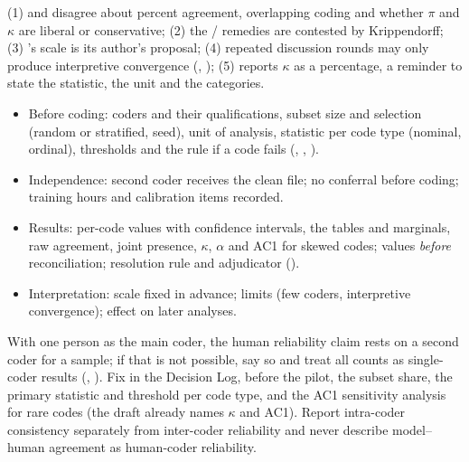 \begin{notebox}
(1)  and  disagree about percent agreement, overlapping coding and whether $\pi$ and $\kappa$ are liberal or conservative; (2) the / remedies are contested by Krippendorff; (3) 's scale is its author's proposal; (4) repeated discussion rounds may only produce interpretive convergence (, ); (5)  reports $\kappa$ as a percentage, a reminder to state the statistic, the unit and the categories.
\end{notebox}

\begin{protocolbox}
\begin{itemize}[leftmargin=1.3em]
\item Before coding: coders and their qualifications, subset size and selection (random or stratified, seed), unit of analysis, statistic per code type (nominal, ordinal), thresholds and the rule if a code fails (, , ).
\item Independence: second coder receives the clean file; no conferral before coding; training hours and calibration items recorded.
\item Results: per-code values with confidence intervals, the tables and marginals, raw agreement, joint presence, $\kappa$, $\alpha$ and AC1 for skewed codes; values \emph{before} reconciliation; resolution rule and adjudicator ().
\item Interpretation: scale fixed in advance; limits (few coders, interpretive convergence); effect on later analyses.
\end{itemize}
\end{protocolbox}

\begin{thesisbox}
With one person as the main coder, the human reliability claim rests on a second coder for a sample; if that is not possible, say so and treat all counts as single-coder results (, ). Fix in the Decision Log, before the pilot, the subset share, the primary statistic and threshold per code type, and the AC1 sensitivity analysis for rare codes (the draft already names $\kappa$ and AC1). Report intra-coder consistency separately from inter-coder reliability and never describe model--human agreement as human-coder reliability.
\end{thesisbox}
